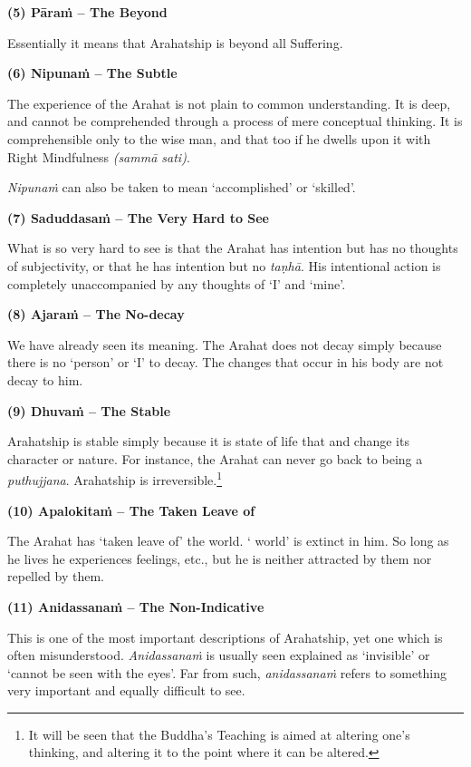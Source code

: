\textbf{(5) Pāraṁ -- The Beyond}

\label{ch-13-beyond}Essentially it means that Arahatship is beyond all Suffering.

\clearpage

\textbf{(6) Nipunaṁ -- The Subtle}

The experience of the Arahat is not plain to common understanding. It is deep, and cannot be comprehended through a process of mere conceptual thinking. It is comprehensible only to the wise man, and that too if he dwells upon it with Right Mindfulness \emph{(sammā sati)}.

\emph{Nipunaṁ} can also be taken to mean `accomplished' or `skilled'.

\textbf{(7) Saduddasaṁ -- The Very Hard to See}

What is so very hard to see is that the Arahat has intention but has no thoughts of subjectivity, or that he has intention but no \emph{taṇhā}. His intentional action is completely unaccompanied by any thoughts of `I' and `mine'.

\textbf{(8) Ajaraṁ -- The No-decay}

We have already seen its meaning. The Arahat does not decay simply because there is no `person' or `I' to decay. The changes that occur in his body are not decay to him.

\textbf{(9) Dhuvaṁ -- The Stable}

Arahatship is  stable simply because it is  state of life that  and  change its character or nature. For instance, the Arahat can never go back to being a \emph{puthujjana}. Arahatship is irreversible.\footnote{It will be seen that the Buddha's Teaching is aimed at altering one's thinking, and altering it to the point where it can  be altered.}

\clearpage

\textbf{(10) Apalokitaṁ -- The Taken Leave of}

The Arahat has `taken leave of' the world. ` world' is extinct in him. So long as he lives he experiences feelings, etc., but he is neither attracted by them nor repelled by them.

\textbf{(11) Anidassanaṁ -- The Non-Indicative}

This is one of the most important descriptions of Arahatship, yet one which is often misunderstood. \emph{Anidassanaṁ} is usually seen explained as `invisible' or `cannot be seen with the eyes'. Far from such, \emph{anidassanaṁ} refers to something very important and equally difficult to see.

